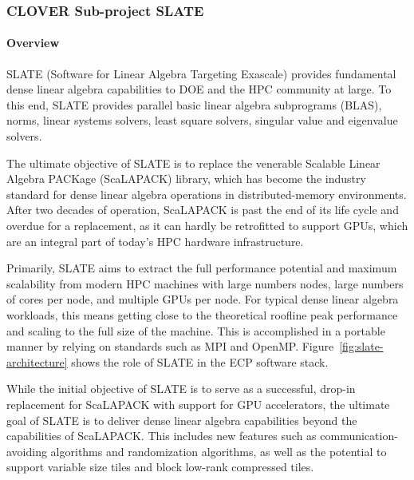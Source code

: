 \subsubsection{ CLOVER Sub-project SLATE}\label{subsubsect:slate}

\paragraph{Overview}

SLATE (Software for Linear Algebra Targeting Exascale)
provides fundamental dense linear algebra capabilities
to DOE and the HPC community at large.
To this end, SLATE provides
parallel basic linear algebra subprograms (BLAS), norms,
linear systems solvers, least square solvers,
singular value and eigenvalue solvers.

The ultimate objective of SLATE is to replace the
venerable Scalable Linear Algebra PACKage (ScaLAPACK) library,
which has become the industry standard for dense linear algebra operations
in distributed-memory environments.
After two decades of operation,
ScaLAPACK is past the end of its life cycle and overdue for a replacement,
as it can hardly be retrofitted to support GPUs,
which are an integral part of today's HPC hardware infrastructure.

Primarily, SLATE aims to extract the full performance potential and maximum
scalability from modern HPC machines with large numbers nodes,
large numbers of cores per node, and multiple GPUs per node.
For typical dense linear algebra workloads, this means getting close
to the theoretical roofline peak performance and scaling to the full size of
the machine.
This is accomplished in a portable manner by relying on standards
such as MPI and OpenMP.
%
Figure~\ref{fig:slate-architecture} shows the role of SLATE
in the ECP software stack.

While the initial objective of SLATE is to serve as a successful,
drop-in replacement for ScaLAPACK with support for GPU accelerators,
the ultimate goal of SLATE is to deliver dense linear algebra capabilities
beyond the capabilities of ScaLAPACK.
This includes new features such as communication-avoiding
algorithms and randomization algorithms, as well as the potential to
support variable size tiles and block low-rank compressed tiles.

